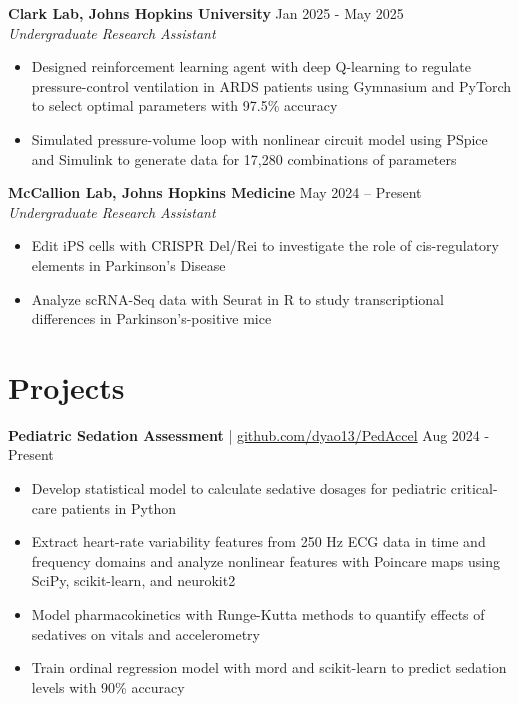 \documentclass[11pt]{article}       %
\begin{document}
\textbf{Clark Lab, Johns Hopkins University} \hfill Jan 2025 - May 2025 \\
\textit{Undergraduate Research Assistant} \vspace{-9pt} \\
\begin{itemize}
  \item Designed reinforcement learning agent with deep Q-learning to regulate pressure-control ventilation in ARDS patients using Gymnasium and PyTorch to select optimal parameters with 97.5\% accuracy
  \item Simulated pressure-volume loop with nonlinear circuit model using PSpice and Simulink to generate data for 17,280 combinations of parameters
\end{itemize}

\textbf{McCallion Lab, Johns Hopkins Medicine} \hfill May 2024 – Present \\
\textit{Undergraduate Research Assistant} \vspace{-9pt} \\
\begin{itemize}
  \item Edit iPS cells with CRISPR Del/Rei to investigate the role of cis-regulatory elements in Parkinson’s Disease
  \item Analyze scRNA-Seq data with Seurat in R to study transcriptional differences in Parkinson’s-positive mice
\end{itemize}

\vspace{-18.5pt}

\section*{Projects}

\textbf{Pediatric Sedation Assessment} | \href{https://github.com/dyao13/PedAccel}{github.com/dyao13/PedAccel} \hfill Aug 2024 - Present \vspace{-9pt} \\
\begin{itemize}
  \item Develop statistical model to calculate sedative dosages for pediatric critical-care patients in Python
  \item Extract heart-rate variability features from 250 Hz ECG data in time and frequency domains and analyze nonlinear features with Poincare maps using SciPy, scikit-learn, and neurokit2
  \item Model pharmacokinetics with Runge-Kutta methods to quantify effects of sedatives on vitals and accelerometry
  \item Train ordinal regression model with mord and scikit-learn to predict sedation levels with 90\% accuracy
\end{itemize}
\end{document}
